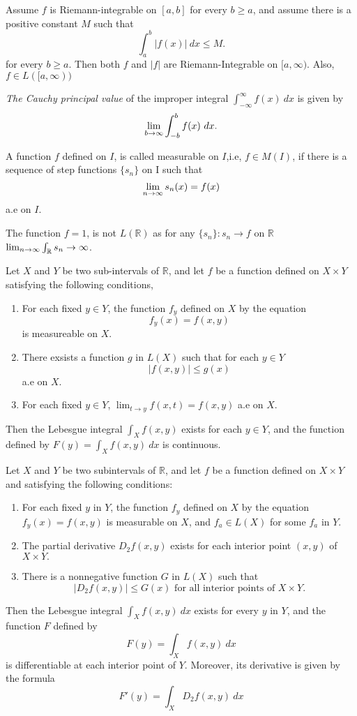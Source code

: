 \documentclass[10pt,a4paper]{book}
\begin{document}
\begin{Thm}
 Assume $f$ is Riemann-integrable on $[a, b]$ for every $b \geq a$, and
assume there is a positive constant $M$ such that
$$\int_a^b |f(x)| \ dx \leq M.$$
for every $b \geq a.$ Then both $f$ and $|f|$ are Riemann-Integrable on $[a, \infty)$. Also, $f \in L([a,\infty))$
\end{Thm}

\noindent \textit{The Cauchy principal value} of the improper integral $\int_{-\infty}^\infty f(x) \ dx$ is given by 
$$\linf[b] \int_{-b}^b f(x)\ dx.$$

\begin{deff}
A function $f$ defined on $I$, is called measurable on $I$,i.e, $f \in M(I)$, if there is a sequence of step functions $\{s_n\}$ on I such that
$$\lim_{ n \to \infty} s_n(x) = f(x)$$
a.e on $I$.
\end{deff}
\PP The function $f = 1$, is not $L(\mathbb{R})$ as for any $\{s_n\}: s_n \to f$ on $\mathbb{R}$ $\lim_{ n \to \infty} \int_{\mathbb{R}} s_n \to \infty$.
\begin{Thm}
Let $X$ and $Y$ be two sub-intervals of $\mathbb{R}$, and let $f$ be a function defined on $X \times Y$ satisfying the following conditions,
\begin{enumerate}
    \item For each fixed $y \in Y$, the function $f_y$ defined on $X$ by the equation
    $$f_y(x) = f(x,y)$$
    is measureable on $X$.
    \item There exsists a function $g$ in $L(X)$ such that for each $y \in Y$
    $$|f(x,y)| \leq g(x) $$
    a.e on $X$.
    \item For each fixed $y \in Y$,
    $\lim_{t \to y}f(x,t) = f(x,y)$
    a.e on $X.$
\end{enumerate}
Then the Lebesgue integral $\int_X f(x,y)$ exists for each $y \in Y$, and the function defined by
$F(y) = \int_X f(x,y)\ dx$
is continuous.
\end{Thm}

\begin{Thm}
\renewcommand{\R}{\mathbb{R}}
Let $X$ and $Y$ be two subintervals of $\R$, and let $f$ be a function defined
on $X \times Y$ and satisfying the following conditions:
\begin{enumerate}
    \item For each fixed $y$ in $Y$, the function $f_y$ defined on $X$ by the equation $f_y(x) = f(x, y)$ is measurable on $X$, and $f_a \in L(X)$ for some $f_a$ in $Y$.
    \item The partial derivative $D_2f(x, y)$ exists for each interior point $(x, y)$ of $X \times Y.$
    \item There is a nonnegative function $G$ in $L(X)$ such that
 $$|D_2 f(x, y)| \leq G(x) \text{ for all interior points of } X \times Y.$$
\end{enumerate}
Then the Lebesgue integral $\int_X f(x, y)\  dx$ exists for every $y$ in $Y$, and the function $F$ defined by
$$F(y) = \int_X f(x,y)\ dx$$
is differentiable at each interior point of $Y$. Moreover, its derivative is given by the formula
$$F'(y) = \int_X D_2f(x,y)\ dx$$

\end{Thm}
\end{document}
